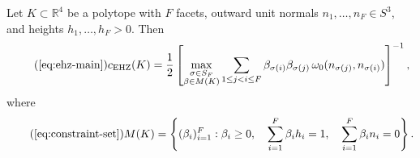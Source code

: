 \begin{theorem*}
Let $K \subset \mathbb{R}^4$ be a polytope
with $F$ facets, outward unit normals $n_1, \ldots, n_F \in S^3$,
and heights $h_1, \ldots, h_F > 0$.
Then
\begin{equation}\tag{\ref{eq:ehz-main}}
  c_{\mathrm{EHZ}}(K) = \frac{1}{2}
  \left[
    \max_{\substack{
      \sigma \in S_F \\
      \beta \in M(K)
    }}
    \sum_{1 \leq j < i \leq F}
      \beta_{\sigma(i)} \beta_{\sigma(j)} \,
      \omega_0(n_{\sigma(j)}, n_{\sigma(i)})
  \right]^{-1},
\end{equation}
where
\begin{equation}\tag{\ref{eq:constraint-set}}
  M(K) = \left\{
    (\beta_i)_{i=1}^{F} :
    \beta_i \geq 0, \quad
    \sum_{i=1}^{F} \beta_i h_i = 1, \quad
    \sum_{i=1}^{F} \beta_i n_i = 0
  \right\}.
\end{equation}
\end{theorem*}

